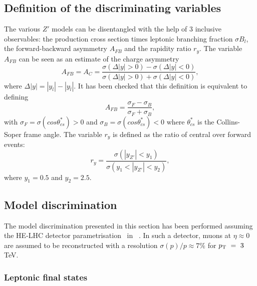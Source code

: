 \documentclass[a4paper,11pt]{article}
\begin{document}
\subsection{Definition of the discriminating variables}
\label{par:vardef}

The various $Z'$ models can be disentangled with the help of 3 inclusive observables: the production cross section times leptonic branching fraction $\sigma B_l$, the forward-backward asymmetry $A_{FB}$ and the rapidity ratio $r_y$. The variable $A_{FB}$ can be seen as an estimate of the charge asymmetry
\begin{equation}
A_{FB} = A_C =  \frac{\sigma(\Delta|y| > 0) - \sigma(\Delta|y| < 0)}{\sigma(\Delta|y| > 0) + \sigma(\Delta|y| < 0)},
\end{equation}
where $\Delta|y| = |y_l| - |y_{\bar{l}}|$. It has been checked that this definition is equivalent to defining
\begin{equation}
A_{FB} = \frac{\sigma_F - \sigma_B}{\sigma_F + \sigma_B},
\end{equation}
with $\sigma_F = \sigma (cos\theta^{*}_{cs})>0$ and $\sigma_B = \sigma (cos\theta^{*}_{cs})<0$ where $\theta^*_{cs}$ is the Collins-Soper frame angle. The variable $r_y$ is defined as the ratio of central over forward events:
\begin{equation}
r_y = \frac{\sigma(|y_{Z'}| < y_1)}{\sigma(y_1 < |y_{Z'}| <y_2)},
\end{equation}
where $y_1=0.5$ and $y_2=2.5$.

\subsection{Model discrimination}

The model discrimination presented in this section has been performed assuming the HE-LHC detector parametrisation~\cite{hlhelhc_web} in \delphes~\cite{deFavereau:2013fsa}. In such a detector, muons at $\eta \approx 0$ are assumed to be reconstructed with a resolution $\sigma(p)/p \approx 7\%$ for $p_{\text{T}}~=~3$\,TeV.

\subsubsection{Leptonic final states}
\label{par:lepana}
\end{document}
